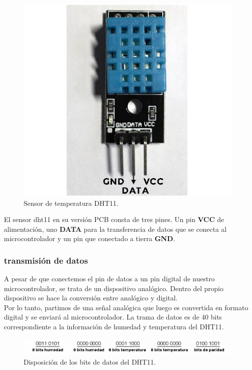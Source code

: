 \begin{figure}[H]
  \begin{center}
    \includegraphics[scale=0.3]{imagenes/dth11.jpg}
  \end{center}
  \caption{Sensor de temperatura DHT11.}
  \label{figura:sensor_dth11}
\end{figure}

El sensor dht11 en su versión PCB consta de tres pines. Un pin \textbf{VCC} de alimentación, uno \textbf{DATA} para la transferencia de
datos que se conecta al microcontrolador y un pin que conectado a tierra \textbf{GND}.\\

\subsubsection{transmisión de datos}

A pesar de que conectemos el pin de datos a un pin digital de nuestro microcontrolador, se trata de un dispositivo analógico. Dentro del propio dispositivo se hace la
conversión entre analógico y digital.\\

Por lo tanto, partimos de una señal analógica que luego es convertida en formato digital y se enviará al microcontrolador. La trama de datos es de 40 bits correspondiente a la
información de humedad y temperatura del DHT11.\\

\begin{figure}[H]
  \begin{center}
    \includegraphics[scale=0.6]{imagenes/dth11_bits.jpg}
  \end{center}
  \caption{Disposición de los bits de datos del DHT11.}
  \label{figura:sensor_dth11_bits}
\end{figure}

